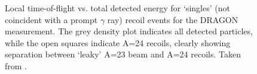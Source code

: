 \begin{figure}
\begin{center}
\caption{Local time-of-flight vs. total detected energy for `singles' (not coincident with a prompt $\gamma$ ray) recoil events for the DRAGON  measurement. The grey density plot indicates all detected particles, while the open squares indicate A=24 recoils, clearly showing separation between `leaky' A=23 beam and A=24 recoils. Taken from \cite{eri10}.}
\label{fig:Mg23_tof_IC}
\end{center}
\end{figure}


